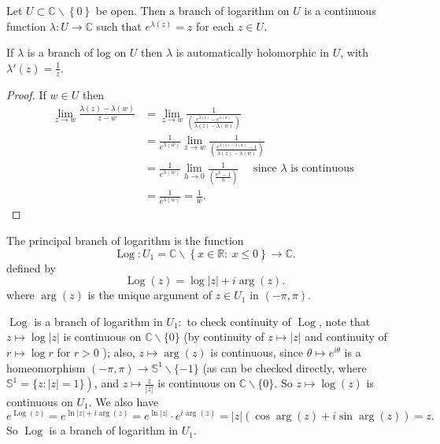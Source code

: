\documentclass[a4paper]{scrartcl}
\begin{document}
\begin{definition*}
      Let $U \subset \mathbb{C} \backslash \left\{0\right\}$ be open. Then a branch of logarithm on $U$ is a continuous function $\lambda: U \rightarrow \mathbb{C}$ such that $e^{\lambda (z)}=z$ for each $z \in U$.
\end{definition*}
\begin{proposition}
      If $\lambda$ is a branch of log on $U$ then $\lambda$ is automatically holomorphic in $U$, with $\lambda' (z)=\frac{1}{z}$.
\end{proposition}
\begin{proof}
      If $w \in U$ then 
      \begin{align*}
           \lim_{z \rightarrow w} \frac{\lambda (z)- \lambda (w)}{z-w}&=\lim_{z \rightarrow w} \frac{1}{\left( \frac{e^{\lambda (z)}-e^{\lambda (w)}}{\lambda (z)- \lambda (w)}\right)}\\
           &=\frac{1}{e^{\lambda (w)}}\lim_{z \rightarrow w} \frac{1}{\left(\frac{e^{\lambda (z)-\lambda (w)}-1}{\lambda (z)- \lambda (w)}\right)}\\
           &=\frac{1}{e^{\lambda (w)}} \lim_{h \rightarrow 0} \frac{1}{\left( \frac{e^{h}-1}{h}\right)} \quad \text{ since } \lambda \text{ is continuous } \\
           &=\frac{1}{e^{\lambda (w)}}=\frac{1}{w}.
      \end{align*}
\end{proof}
\begin{definition*}
      The principal branch of logarithm is the function \[
      \operatorname{Log}: U_1 =\mathbb{C} \backslash \left\{x \in \mathbb{R}: \ x \leq 0\right\} \rightarrow \mathbb{C}
      .\] defined by \[
      \operatorname{Log}(z)= \operatorname{log}|z|+i \operatorname{arg}(z)
      .\] where $\operatorname{arg}(z)$ is the unique argument of $z \in U_1 $ in $(-\pi,\pi)$.
\end{definition*}
\begin{remark}
     $\operatorname{Log}$ is a branch of logarithm in $U_{1}:$ to check continuity of $\operatorname{Log}$, note that
     $z \mapsto \log |z|$ is continuous on $\mathbb{C} \backslash\{0\}$ (by continuity of $z \mapsto|z|$ and
     continuity of $r \mapsto \log r$ for $r>0$ ); also, $z \mapsto \arg (z)$ is continuous, since
     $\theta \mapsto e^{i \theta}$ is a homeomorphism $(-\pi, \pi) \rightarrow \mathbb{S}^{1} \backslash\{-1\}$ (as can be checked
     directly, where $\left.\mathbb{S}^{1}=\{z:|z|=1\}\right)$, and $z \mapsto \frac{z}{|z|}$ is continuous on
     $\mathbb{C} \backslash\{0\} .$ So $z \mapsto \log (z)$ is continuous on $U_{1}$.
     We also have \[
          e^{\operatorname{Log} (z)}=e^{\ln |z|+i \arg (z)}=e^{\ln |z|} \cdot e^{i \text { arg }(z)}=
          |z|(\cos \arg (z)+i \sin \arg (z))=z
     .\]  So $\operatorname{Log}$ is a branch of logarithm in $U_{1}$.
\end{remark}
\end{document}
